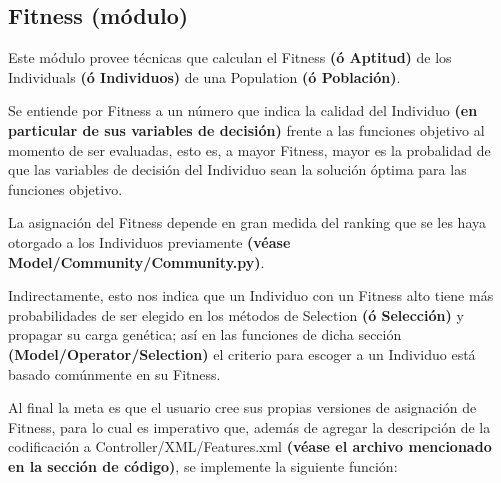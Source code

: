 \documentclass[letterpaper,10pt,english]{sphinxmanual}
\begin{document}
\subsection{Fitness (módulo)}
\label{Model/Fitness/Fitness::doc}\label{Model/Fitness/Fitness:fitness-modulo}
Este módulo provee técnicas que calculan el Fitness \textbf{(ó Aptitud)} de los
Individuals \textbf{(ó Individuos)} de una Population \textbf{(ó Población)}.

Se entiende por Fitness a un número que indica la calidad del
Individuo \textbf{(en particular de sus variables de decisión)} frente a
las funciones objetivo al momento de ser evaluadas, esto es, a mayor Fitness, mayor
es la probalidad de que las variables de decisión del Individuo sean la solución óptima
para las funciones objetivo.

La asignación del Fitness depende en gran medida del ranking que se les haya
otorgado a los Individuos previamente \textbf{(véase Model/Community/Community.py)}.

Indirectamente, esto nos indica que un Individuo con un Fitness alto
tiene más probabilidades de ser elegido en los métodos de Selection \textbf{(ó Selección)}
y propagar su carga genética; así en las funciones de dicha sección \textbf{(Model/Operator/Selection)}
el criterio para escoger a un Individuo está basado comúnmente en su Fitness.

Al final la meta es que el usuario cree sus propias versiones de asignación
de Fitness, para lo cual es imperativo que, además de agregar la descripción de
la codificación a Controller/XML/Features.xml \textbf{(véase el archivo mencionado en la sección de código)},
se implemente la siguiente función:
\end{document}
